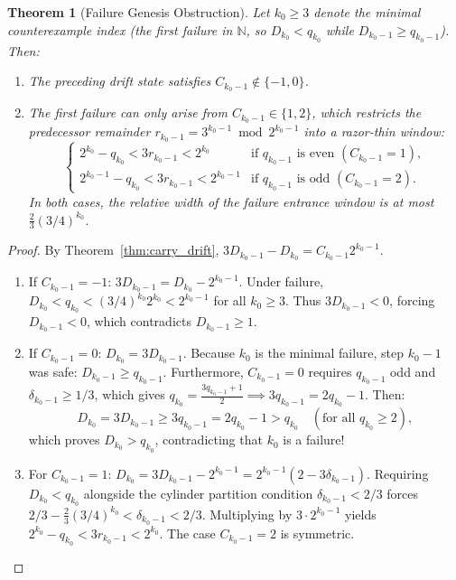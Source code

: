 \documentclass[11pt,reqno]{amsart}
\newtheorem{theorem}{Theorem}[section]
\theoremstyle{definition}
\numberwithin{equation}{section}
\begin{document}
\begin{theorem}[Failure Genesis Obstruction]\label{thm:genesis_obstruction}
Let $k_0 \ge 3$ denote the minimal counterexample index (the first failure in $\mathbb{N}$, so $D_{k_0} < q_{k_0}$ while $D_{k_0-1} \ge q_{k_0-1}$). Then:
\begin{enumerate}
    \item The preceding drift state satisfies $C_{k_0-1} \notin \{-1, 0\}$.
    \item The first failure can only arise from $C_{k_0-1} \in \{1, 2\}$, which restricts the predecessor remainder $r_{k_0-1} = 3^{k_0-1} \bmod 2^{k_0-1}$ into a razor-thin window:
    \begin{equation}\label{eq:genesis_window}
    \begin{cases}
    2^{k_0} - q_{k_0} < 3 r_{k_0-1} < 2^{k_0} & \text{if } q_{k_0-1} \text{ is even } (C_{k_0-1} = 1), \\
    2^{k_0-1} - q_{k_0} < 3 r_{k_0-1} < 2^{k_0-1} & \text{if } q_{k_0-1} \text{ is odd } (C_{k_0-1} = 2).
    \end{cases}
    \end{equation}
    In both cases, the relative width of the failure entrance window is at most $\frac{2}{3}(3/4)^{k_0}$.
\end{enumerate}
\end{theorem}

\begin{proof}
By Theorem~\ref{thm:carry_drift}, $3 D_{k_0-1} - D_{k_0} = C_{k_0-1} 2^{k_0-1}$.
\begin{enumerate}
    \item If $C_{k_0-1} = -1$: $3 D_{k_0-1} = D_{k_0} - 2^{k_0-1}$. Under failure, $D_{k_0} < q_{k_0} < (3/4)^{k_0} 2^{k_0} < 2^{k_0-1}$ for all $k_0 \ge 3$. Thus $3 D_{k_0-1} < 0$, forcing $D_{k_0-1} < 0$, which contradicts $D_{k_0-1} \ge 1$.
    \item If $C_{k_0-1} = 0$: $D_{k_0} = 3 D_{k_0-1}$. Because $k_0$ is the minimal failure, step $k_0 - 1$ was safe: $D_{k_0-1} \ge q_{k_0-1}$. Furthermore, $C_{k_0-1} = 0$ requires $q_{k_0-1}$ odd and $\delta_{k_0-1} \ge 1/3$, which gives $q_{k_0} = \frac{3 q_{k_0-1} + 1}{2} \implies 3 q_{k_0-1} = 2 q_{k_0} - 1$. Then:
    \[
    D_{k_0} = 3 D_{k_0-1} \ge 3 q_{k_0-1} = 2 q_{k_0} - 1 > q_{k_0} \quad (\text{for all } q_{k_0} \ge 2),
    \]
    which proves $D_{k_0} > q_{k_0}$, contradicting that $k_0$ is a failure!
    \item For $C_{k_0-1} = 1$: $D_{k_0} = 3 D_{k_0-1} - 2^{k_0-1} = 2^{k_0-1}(2 - 3 \delta_{k_0-1})$. Requiring $D_{k_0} < q_{k_0}$ alongside the cylinder partition condition $\delta_{k_0-1} < 2/3$ forces $2/3 - \frac{2}{3}(3/4)^{k_0} < \delta_{k_0-1} < 2/3$. Multiplying by $3 \cdot 2^{k_0-1}$ yields $2^{k_0} - q_{k_0} < 3 r_{k_0-1} < 2^{k_0}$. The case $C_{k_0-1} = 2$ is symmetric. \qedhere
\end{enumerate}
\end{proof}
\end{document}
